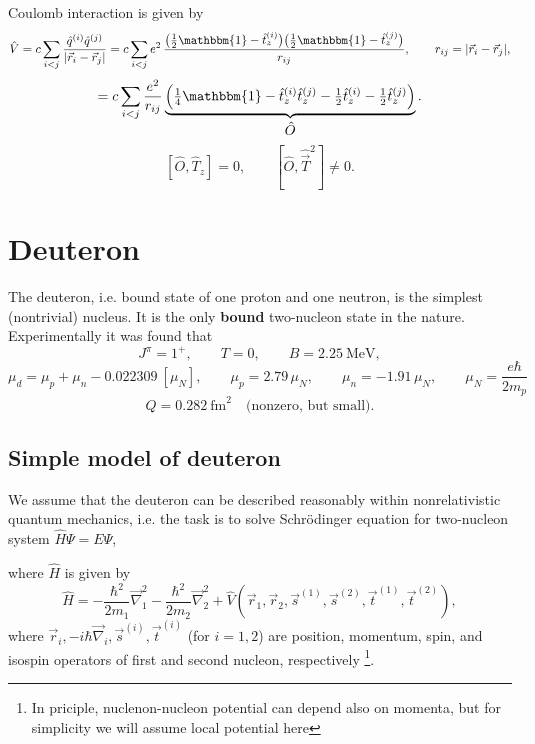 \documentclass[11pt,a4paper]{article}
\newcommand{\op}[1]{\hat{#1}}
\begin{document}
Coulomb interaction is given by
\[
\op V=c\sum_{i<j}\frac{\op q^{(i)}\op q^{(j)}}{|\vec r_i-\vec r_j|}
=c\sum_{i<j} e^2\,
\frac{\big(\tfrac12 \mathbbm{1} -\op t_z^{(i)}\big)\big(\tfrac12 \mathbbm{1} -\op t_z^{(j)}\big)}{r_{ij}},
\qquad r_{ij}=|\vec r_i-\vec r_j|,
\]
\[
=c\sum_{i<j}\frac{e^2}{r_{ij}}
\underbrace{\Big(\tfrac14 \mathbbm{1} -\op t_z^{(i)}\op t_z^{(j)}
-\tfrac12\op t_z^{(i)}-\tfrac12\op t_z^{(j)}\Big)}_{\displaystyle \op O} .
\]
\[
[\op O,\op T_z]=0, \qquad [\op O,\op {\vec T}^2]\ne 0 .
\]


\section{Deuteron}

The deuteron, i.e. bound state of one proton and one neutron, is the simplest (nontrivial) nucleus. It is the only {\bf bound} two-nucleon state in the nature. 
Experimentally it was found that
\[
J^\pi=1^+,\qquad T=0,\qquad B=2.25\ \text{MeV},
\]
\[
\mu_d=\mu_p+\mu_n-0.022309\ [\mu_N],\qquad
\mu_p=2.79\,\mu_N,\qquad \mu_n=-1.91\,\mu_N,\qquad
\mu_N=\frac{e\hbar}{2m_p}\
\]
\[
Q=0.282\ \text{fm}^2 \quad\text{(nonzero, but small).}
\]
\subsection{Simple model of deuteron}
We assume that the deuteron can be described reasonably within nonrelativistic quantum mechanics, i.e. the task is to solve Schr\"odinger equation for two-nucleon system $\op H\Psi=E\Psi$,
\begin{center}
\end{center}

where $\op H$ is given by
\[
\op H=-\frac{\hbar^2}{2m_1}\vec\nabla_1^2-\frac{\hbar^2}{2m_2}\vec\nabla_2^2
+\op V(\vec r_1,\vec r_2,\vec s^{(1)},\vec s^{(2)},\vec t^{(1)},\vec t^{(2)}), 
\]
where $\vec r_i, -i \hbar\vec \nabla_i,  \vec s^{(i)}, \vec t^{(i)}$ (for $i=1,2$) are position, momentum, spin, and isospin operators of first and second nucleon, respectively \footnote{In priciple, nuclenon-nucleon potential can depend also on momenta, but for simplicity we will assume local potential here}. 
\end{document}

